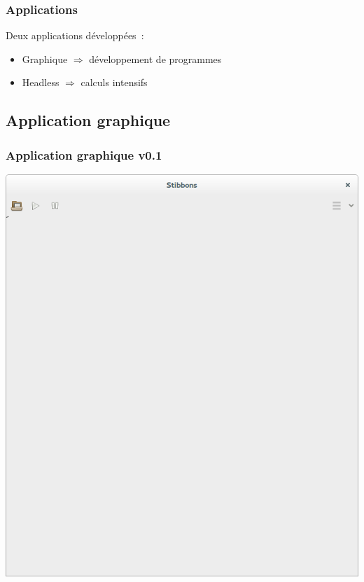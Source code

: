 \begin{frame}
\frametitle{Applications}
Deux applications développées~:
\begin{itemize}
	\item Graphique $\Rightarrow$ développement de programmes
	\item Headless $\Rightarrow$ calculs intensifs
\end{itemize}
\end{frame}

\subsection{Application graphique}

\begin{frame}
\frametitle{Application graphique v0.1}
\begin{center}
\includegraphics[scale=0.16]{doc/report/screenshot/stibbons-0-1-1.png}
~~~~~~~~

\end{center}
\end{frame}
